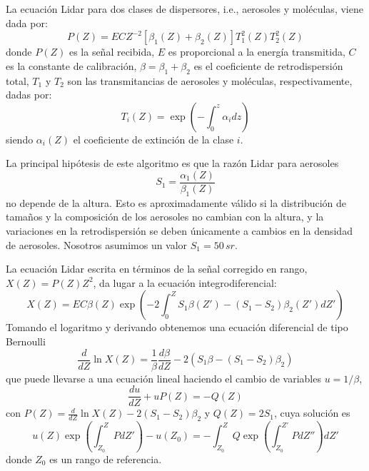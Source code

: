 \documentclass[12pt,a4paper,final]{report}
\begin{document}
	La ecuación Lidar para dos clases de dispersores, i.e., aerosoles y moléculas, viene dada por:
	\begin{equation}
	P(Z) = EC Z^{-2} [\beta_1(Z) + \beta_2(Z)] T_1^2(Z) T_2^2(Z)
	\end{equation}
	donde $P(Z)$ es la señal recibida, $E$ es proporcional a la energía transmitida, $C$ es la constante de calibración, $\beta=\beta_1 + \beta_2$ es el coeficiente de retrodispersión total, $T_1$ y $T_2$ son las transmitancias de aerosoles y moléculas, respectivamente, dadas por:
	\begin{equation}
	T_i(Z) = \exp \left(-\int_0^z \alpha_i dz \right)
	\end{equation}
	siendo $\alpha_i(Z)$ el coeficiente de extinción de la clase $i$.
	
	La principal hipótesis de este algoritmo es que la razón Lidar para aerosoles
	\begin{equation}
	S_1=\dfrac{\alpha_1(Z)}{\beta_1(Z)}
	\end{equation}
	no depende de la altura. Esto es aproximadamente válido si la distribución de tamaños y la composición de los aerosoles no cambian con la altura, y la variaciones en la retrodispersión se deben únicamente a cambios en la densidad de aerosoles. Nosotros asumimos un valor $S_1=50  \, sr$. 
	
	La ecuación Lidar escrita en términos de la señal corregido en rango, $X(Z)=P(Z) Z^2$, da lugar a la ecuación integrodiferencial:
	\begin{equation}
	X(Z) = EC \beta(Z) \exp \left(  -2\int_0^Z S_1 \beta(Z') - (S_1 - S_2) \beta_2(Z') dZ' \right)
	\end{equation}
	Tomando el logaritmo y derivando obtenemos una ecuación diferencial de tipo Bernoulli
	\begin{equation}
	\frac{d}{dZ}\ln X(Z) =\dfrac{1}{\beta} \dfrac{d \beta}{dZ}-2(S_1 \beta - (S_1-S_2) \beta_2)
	\end{equation}
	que puede llevarse a una ecuación lineal haciendo el cambio de variables $ u=1/\beta $, 
	\begin{equation}
	\frac{du}{dZ}+uP(Z)=-Q(Z)
	\end{equation}
	con $P(Z)=\frac{d}{dZ}\ln X(Z)-2(S_1-S_2)\beta_2$ y $Q(Z)=2S_1$, cuya solución es
	\begin{equation}
	u(Z) \exp \left(\int_{Z_0}^{Z} P dZ'\right)-u(Z_0) = -\int_{Z_0}^{Z} Q \exp \left(\int_{Z_0}^{Z'} P dZ''\right) dZ'
	\end{equation}
	donde $Z_0$ es un rango de referencia.
	
\end{document}
